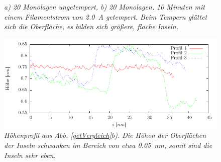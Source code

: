 \begin{figure}[H]
	\begin{minipage}[b]{0.5\textwidth} 
		\sffamily
		
	\end{minipage}
	\hfill
	\begin{minipage}[b]{0.5\textwidth}
		\sffamily
		
	\end{minipage}
	\caption{\textit{a) 20 Monolagen ungetempert, b) 20 Monolagen, 10 Minuten mit einem Filamentstrom
	von \SI{2,0}{A} getempert.
	Beim Tempern glättet sich die Oberfläche, es bilden sich größere, flache Inseln.}}
	\label{getVergleich} 
	\centering
		\includegraphics{pics/profiles20MLget}
	\caption{\textit{Höhenprofil aus Abb. \ref{getVergleich}b). Die Höhen der Oberflächen der Inseln
	schwanken im Bereich von etwa \SI{0,05}{nm}, somit sind die Inseln sehr eben.}}
	\label{profil20MLget}
\end{figure}

\FloatBarrier